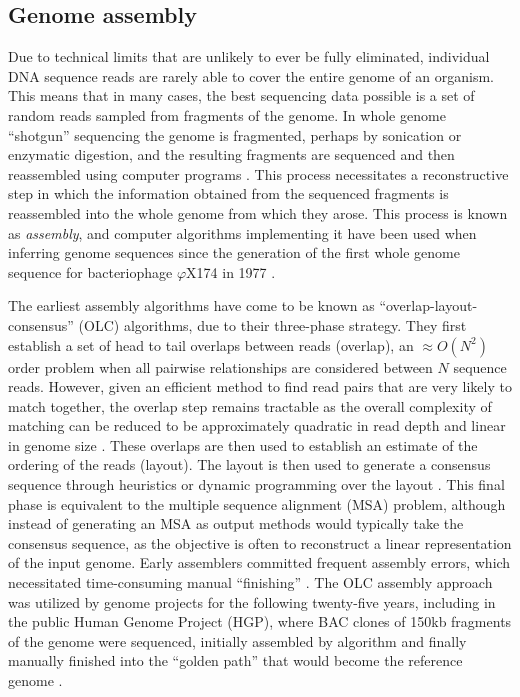 
\subsection{Genome assembly}
\label{sec:genome_assembly}

Due to technical limits that are unlikely to ever be fully eliminated, individual DNA sequence reads are rarely able to cover the entire genome of an organism.
This means that in many cases, the best sequencing data possible is a set of random reads sampled from fragments of the genome. 
In whole genome ``shotgun'' sequencing the genome is fragmented, perhaps by sonication or enzymatic digestion, and the resulting fragments are sequenced and then reassembled using computer programs \cite{gardner1981complete, sanger1982nucleotide}.
This process necessitates a reconstructive step in which the information obtained from the sequenced fragments is reassembled into the whole genome from which they arose.
This process is known as \emph{assembly}, and computer algorithms implementing it have been used when inferring genome sequences since the generation of the first whole genome sequence for bacteriophage $\varphi$X174 in 1977 \cite{sanger1977nucleotide, staden1979strategy}.

The earliest assembly algorithms have come to be known as ``overlap-layout-consensus'' (OLC) algorithms, due to their three-phase strategy.
They first establish a set of head to tail overlaps between reads (overlap), an $\approx O(N^{2})$ order problem when all pairwise relationships are considered between $N$ sequence reads.
However, given an efficient method to find read pairs that are very likely to match together, the overlap step remains tractable as the overall complexity of matching can be reduced to be approximately quadratic in read depth and linear in genome size \cite{huang1992contig}.
These overlaps are then used to establish an estimate of the ordering of the reads (layout).
The layout is then used to generate a consensus sequence through heuristics or dynamic programming over the layout \cite{kececioglu1995combinatorial}.
This final phase is equivalent to the multiple sequence alignment (MSA) problem, although instead of generating an MSA as output methods would typically take the consensus sequence, as the objective is often to reconstruct a linear representation of the input genome.
Early assemblers committed frequent assembly errors, which necessitated time-consuming manual ``finishing'' \cite{gordon1998consed}.
The OLC assembly approach was utilized by genome projects for the following twenty-five years, including in the public Human Genome Project (HGP), where BAC clones of 150kb fragments of the genome were sequenced, initially assembled by algorithm and finally manually finished into the ``golden path'' that would become the reference genome \cite{international2001initial}.

